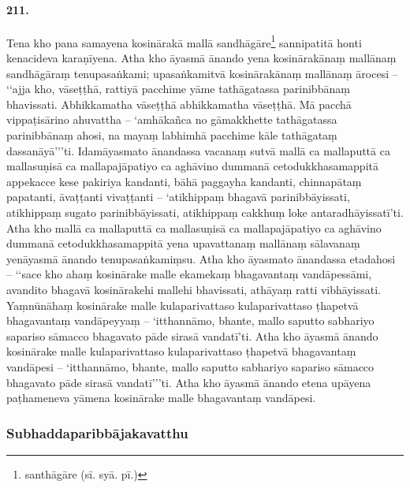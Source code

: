 \paragraph{211.} Tena kho pana samayena kosinārakā mallā sandhāgāre\footnote{santhāgāre (sī. syā. pī.)} sannipatitā honti kenacideva karaṇīyena. Atha kho āyasmā ānando yena kosinārakānaṃ mallānaṃ sandhāgāraṃ tenupasaṅkami; upasaṅkamitvā kosinārakānaṃ mallānaṃ ārocesi – ‘‘ajja kho, vāseṭṭhā, rattiyā pacchime yāme tathāgatassa parinibbānaṃ bhavissati. Abhikkamatha vāseṭṭhā abhikkamatha vāseṭṭhā. Mā pacchā vippaṭisārino ahuvattha – ‘amhākañca no gāmakkhette tathāgatassa parinibbānaṃ ahosi, na mayaṃ labhimhā pacchime kāle tathāgataṃ dassanāyā’’’ti. Idamāyasmato ānandassa vacanaṃ sutvā mallā ca mallaputtā ca mallasuṇisā ca mallapajāpatiyo ca aghāvino dummanā cetodukkhasamappitā appekacce kese pakiriya kandanti, bāhā paggayha kandanti, chinnapātaṃ papatanti, āvaṭṭanti vivaṭṭanti – ‘atikhippaṃ bhagavā parinibbāyissati, atikhippaṃ sugato parinibbāyissati, atikhippaṃ cakkhuṃ loke antaradhāyissatī’ti. Atha kho mallā ca mallaputtā ca mallasuṇisā ca mallapajāpatiyo ca aghāvino dummanā cetodukkhasamappitā yena upavattanaṃ mallānaṃ sālavanaṃ yenāyasmā ānando tenupasaṅkamiṃsu. Atha kho āyasmato ānandassa etadahosi – ‘‘sace kho ahaṃ kosinārake malle ekamekaṃ bhagavantaṃ vandāpessāmi, avandito bhagavā kosinārakehi mallehi bhavissati, athāyaṃ ratti vibhāyissati. Yaṃnūnāhaṃ kosinārake malle kulaparivattaso kulaparivattaso ṭhapetvā bhagavantaṃ vandāpeyyaṃ – ‘itthannāmo, bhante, mallo saputto sabhariyo sapariso sāmacco bhagavato pāde sirasā vandatī’ti. Atha kho āyasmā ānando kosinārake malle kulaparivattaso kulaparivattaso ṭhapetvā bhagavantaṃ vandāpesi – ‘itthannāmo, bhante, mallo saputto sabhariyo sapariso sāmacco bhagavato pāde sirasā vandatī’’’ti. Atha kho āyasmā ānando etena upāyena paṭhameneva yāmena kosinārake malle bhagavantaṃ vandāpesi.

\subsubsection{Subhaddaparibbājakavatthu}

